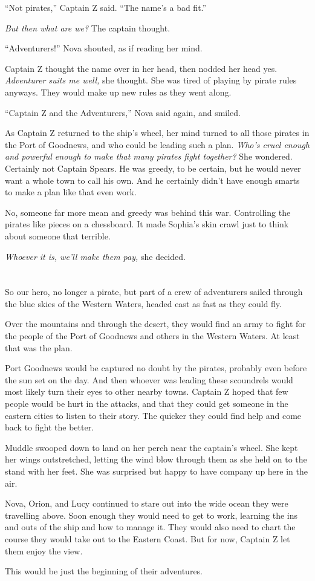 \documentclass[12pt]{extbook}
\begin{document}
  \enquote{Not pirates,} Captain Z said. \enquote{The name's a bad fit.}
  
  \emph{But then what are we?} The captain thought.
  
  \enquote{Adventurers!} Nova shouted, as if reading her mind.
  
  Captain Z thought the name over in her head, then nodded her head yes.
  \emph{Adventurer suits me well,} she thought. She was tired of playing
  by pirate rules anyways. They would make up new rules as they went
  along.
  
  \enquote{Captain Z and the Adventurers,} Nova said again, and smiled.
  
  As Captain Z returned to the ship's wheel, her mind turned to all those
  pirates in the Port of Goodnews, and who could be leading such a plan.
  \emph{Who's cruel enough and powerful enough to make that many pirates
  fight together?} She wondered. Certainly not Captain Spears. He was
  greedy, to be certain, but he would never want a whole town to call his
  own. And he certainly didn't have enough smarts to make a plan like that
  even work.
  
  No, someone far more mean and greedy was behind this war. Controlling
  the pirates like pieces on a chessboard. It made Sophia's skin crawl
  just to think about someone that terrible.
  
  \emph{Whoever it is, we'll make them pay,} she decided.
  
  \section{}\label{section-40}
  
  So our hero, no longer a pirate, but part of a crew of adventurers
  sailed through the blue skies of the Western Waters, headed east as fast
  as they could fly.
  
  Over the mountains and through the desert, they would find an army to
  fight for the people of the Port of Goodnews and others in the Western
  Waters. At least that was the plan.
  
  Port Goodnews would be captured no doubt by the pirates, probably even
  before the sun set on the day. And then whoever was leading these
  scoundrels would most likely turn their eyes to other nearby towns.
  Captain Z hoped that few people would be hurt in the attacks, and that
  they could get someone in the eastern cities to listen to their story.
  The quicker they could find help and come back to fight the better.
  
  Muddle swooped down to land on her perch near the captain's wheel. She
  kept her wings outstretched, letting the wind blow through them as she
  held on to the stand with her feet. She was surprised but happy to have
  company up here in the air.
  
  Nova, Orion, and Lucy continued to stare out into the wide ocean they
  were travelling above. Soon enough they would need to get to work,
  learning the ins and outs of the ship and how to manage it. They would
  also need to chart the course they would take out to the Eastern Coast.
  But for now, Captain Z let them enjoy the view.
  
  This would be just the beginning of their adventures.
\end{document}
